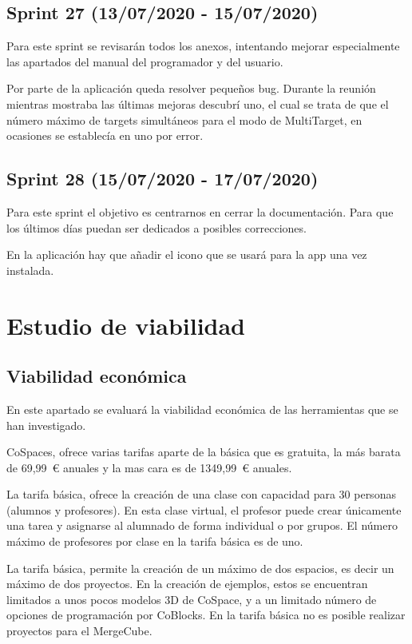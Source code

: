   \subsection{Sprint 27 (13/07/2020 - 15/07/2020)} 
 Para este sprint se revisarán todos los anexos, intentando mejorar especialmente las apartados del manual del programador y del usuario.
 
Por parte de la aplicación queda resolver pequeños bug. Durante la reunión mientras mostraba las últimas mejoras descubrí uno, el cual se trata de que el número máximo de targets simultáneos para el modo de MultiTarget, en ocasiones se establecía en uno por error.

 \subsection{Sprint 28 (15/07/2020 - 17/07/2020)}
  Para este sprint el objetivo es centrarnos en cerrar la documentación. Para que los últimos días puedan ser dedicados a posibles correcciones.
  
  En la aplicación hay que añadir el icono que se usará para la app una vez instalada.
  
\section{Estudio de viabilidad}

\subsection{Viabilidad económica}

En este apartado se evaluará la viabilidad económica de las herramientas que se han investigado.


CoSpaces, ofrece varias tarifas aparte de la básica que es gratuita, la más barata de 69,99~\euro{}  anuales y la mas cara es de 1349,99~\euro{} anuales.

La tarifa básica, ofrece la creación de una clase con capacidad para 30 personas (alumnos y profesores). En esta clase virtual, el profesor puede crear únicamente una tarea y asignarse al alumnado de forma individual o por grupos. El número máximo de profesores por clase en la tarifa básica es de uno.

La tarifa básica, permite la creación de un máximo de dos espacios, es decir un máximo de dos proyectos. En la creación de ejemplos, estos se encuentran limitados a unos pocos modelos 3D de CoSpace, y a un limitado número de opciones de programación por CoBlocks. En la tarifa básica no es posible realizar proyectos para el MergeCube.

